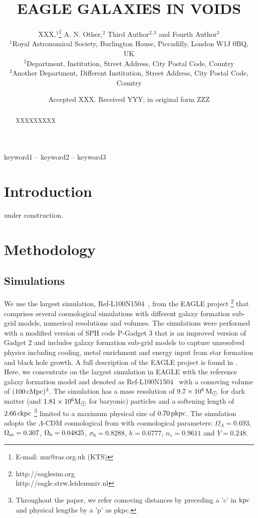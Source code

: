 \documentclass[a4paper,fleqn,usenatbib,letter]{mnras}
\title[EAGLE GALAXIES IN VOIDS]{EAGLE GALAXIES IN VOIDS}
\author[XXX]{
XXX,$^{1}$\thanks{E-mail: mn@ras.org.uk (KTS)}
A. N. Other,$^{2}$
Third Author$^{2,3}$
and Fourth Author$^{3}$
\\
$^{1}$Royal Astronomical Society, Burlington House, Piccadilly, London W1J 0BQ, UK\\
$^{2}$Department, Institution, Street Address, City Postal Code, Country\\
$^{3}$Another Department, Different Institution, Street Address, City Postal Code, Country
}
\date{Accepted XXX. Received YYY; in original form ZZZ}
\newcommand{\Msun}{\rm M_{\sun}}
\newcommand{\kpc}{\rm kpc}
\newcommand{\ckpc}{\rm ckpc}
\newcommand{\pkpc}{\rm pkpc}
\newcommand{\cMpc}{\rm cMpc}
\newcommand{\REF}{Ref-L100N1504}
\begin{document}
\label{firstpage}
\pagerange{\pageref{firstpage}--\pageref{lastpage}}
\maketitle

\begin{abstract}

XXXXXXXXX
\end{abstract}

\begin{keywords}
keyword1 -- keyword2 -- keyword3
\end{keywords}



\section{Introduction}
under construction.
\section{Methodology}
\subsection{ Simulations}
We use the largest simulation, \REF~, from the EAGLE project  \citep{schaye2015,crain2015} \footnote{http://eaglesim.org \\
http://eagle.strw.leidenuniv.nl}  that comprises several  cosmological simulations with different galaxy formation sub-grid models, numerical resolutions and  volumes.  The simulations were performed with a modified  version of SPH code P-Gadget 3 that is an improved version of  Gadget 2  \citep{springel2005b} and includes galaxy formation sub-grid models to capture unresolved physics including cooling, metal enrichment  and energy input from star formation and black hole growth.  A full description of  the EAGLE project is found in \cite{schaye2015,crain2015}. 
Here, we concentrate on the largest simulation in EAGLE with the reference galaxy formation model and denoted as  \REF~ with a comoving volume of  $(100\, \cMpc)^3$. The simulation  has a mass resolution of $9.7 \times  10^6 \,\Msun$ for dark matter (and $1.81 \times 10^6 \Msun $ for baryonic) particles and   a softening length of $2.66 \,\ckpc$ \footnote{Throughout the paper, we refer  comoving distances  by preceding a 'c' in $\kpc$  and physical lengths  by  a 'p' as  \pkpc.}  limited to a maximum physical  size of $0.70\, \pkpc$.  The simulation adopts the $\Lambda$-CDM cosmological from \cite{planck13} with cosmological parameters: $\Omega_\Lambda=0.693$, $\Omega_{\rm m}=0.307$, $\Omega_{\rm b}=0.04825$, $\sigma_8=0.8288$, $h=0.6777$, $n_{s}=0.9611$ and $Y=0.248$. 
\end{document}
